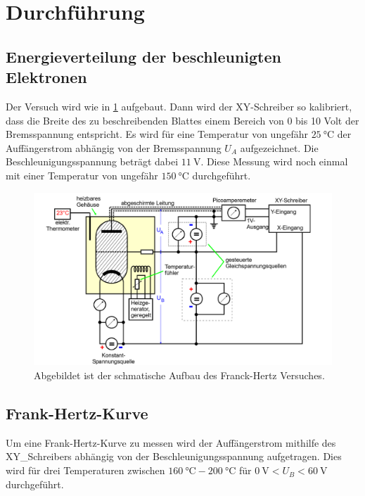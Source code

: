\section{Durchführung}
\label{sec:Durchführung}

\subsection{Energieverteilung der beschleunigten Elektronen}
Der Versuch wird wie in \ref{fig:Aufbau} aufgebaut.
Dann wird der XY-Schreiber so kalibriert, dass die Breite des zu beschreibenden Blattes einem Bereich von 0 bis 10 Volt der Bremsspannung entspricht.
Es wird für eine Temperatur von ungefähr $\qty{25}{\celsius}$ der Auffängerstrom abhängig von der Bremsspannung $U_A$ aufgezeichnet.
Die Beschleunigungsspannung beträgt dabei $\qty{11}{\volt}$. 
Diese Messung wird noch einmal mit einer Temperatur von ungefähr $\qty{150}{\celsius}$ durchgeführt.


\begin{figure}[H]
    \centering
    \includegraphics[width=\textwidth]{Bilder/Aufbau.png}
    \caption{Abgebildet ist der schmatische Aufbau des Franck-Hertz Versuches.}
    \label{fig:Aufbau}
\end{figure}

\subsection{Frank-Hertz-Kurve}
Um eine Frank-Hertz-Kurve zu messen wird der Auffängerstrom mithilfe des XY_Schreibers abhängig von der Beschleunigungsspannung aufgetragen.
Dies wird für drei Temperaturen zwischen $\qty{160}{\celsius}-\qty{200}{\celsius}$ für $\qty{0}{\volt}<U_B<\qty{60}{\volt}$ durchgeführt.